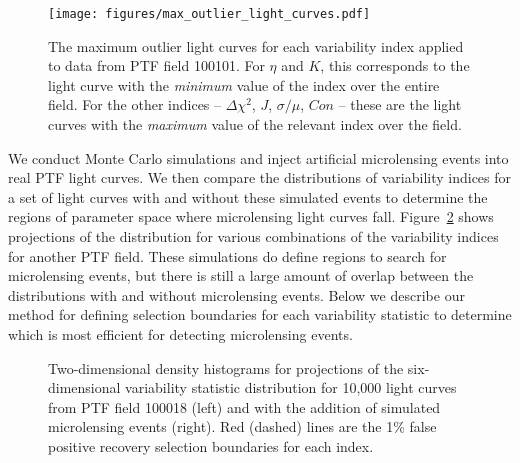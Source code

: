 \documentclass{emulateapj}
\begin{document}
\begin{figure}
\centering\texttt{[image: figures/max\_outlier\_light\_curves.pdf]}
\caption{The maximum outlier light curves for each variability index applied to data from PTF field 100101. For $\eta$ and $K$, this corresponds to the light curve with the \emph{minimum} value of the index over the entire field. For the other indices -- $\Delta\chi^2$, $J$, $\sigma/\mu$, $Con$ -- these are the light curves with the \emph{maximum} value of the relevant index over the field. } \label{fig:indices_examples}
\end{figure}

We conduct Monte Carlo simulations and inject artificial microlensing events into real PTF light curves. We then compare the distributions of variability indices for a set of light curves with and without these simulated events to determine the regions of parameter space where microlensing light curves fall. Figure~\ref{fig:var_indices} shows projections of the distribution for various combinations of the variability indices for another PTF field. These simulations do define regions to search for microlensing events, but there is still a large amount of overlap between the distributions with and without microlensing events. Below we describe our method for defining selection boundaries for each variability statistic to determine which is most efficient for detecting microlensing events.


\begin{figure}[t]
\centering
	
	
	\caption{Two-dimensional density histograms for projections of the six-dimensional variability statistic distribution for 10,000 light curves from PTF field 100018 (left) and with the addition of simulated microlensing events (right). Red (dashed) lines are the 1\% false positive recovery selection boundaries for each index.} 
	\label{fig:var_indices}
\end{figure}
\end{document}
